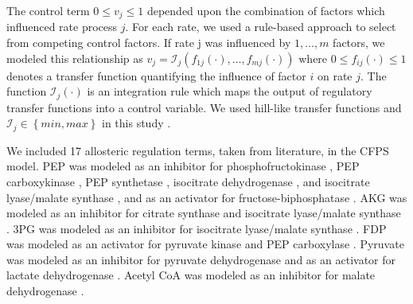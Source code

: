 \documentclass[12pt]{article}
\begin{document}
The control term $0\leq v_{j}\leq 1$ depended upon the combination of factors which influenced rate process $j$.
For each rate, we used a rule-based approach to select from competing control factors.
If rate j was influenced by $1,\dots,m$ factors, we modeled this relationship as
$v_{j}=\mathcal{I}_{j}\left(f_{1j}\left(\cdot\right),\hdots,f_{mj}\left(\cdot\right)\right)$
where $0\leq f_{ij}\left(\cdot\right)\leq 1$ denotes a transfer function quantifying the influence of factor $i$ on rate $j$.
The function $\mathcal{I}_{j}\left(\cdot\right)$ is an integration rule which maps the output of regulatory transfer functions into a control
variable. We used hill-like transfer functions and $\mathcal{I}_{j}\in\left\{min,max\right\}$ in this study \cite{pr3010138}.

We included 17 allosteric regulation terms, taken from literature, in the CFPS model.
PEP was modeled as an inhibitor for phosphofructokinase \cite{2010_kotte_MolSystBiol,2011_cabrera_JBiolChem}, PEP carboxykinase \cite{2010_kotte_MolSystBiol}, PEP synthetase \cite{2010_kotte_MolSystBiol,1973_chulavatnatol_JBiolChem}, isocitrate dehydrogenase \cite{2010_kotte_MolSystBiol,2007_ogawa_JBacteriol}, and isocitrate lyase\slash malate synthase \cite{2010_kotte_MolSystBiol,2007_ogawa_JBacteriol,1988_mackintosh_BiochemJ}, and as an activator for fructose-biphosphatase \cite{2010_kotte_MolSystBiol,2000_donahue_JBacteriol,2006_hines_JBiolChem,2007_hines_JBiolChem}.
AKG was modeled as an inhibitor for citrate synthase \cite{2010_kotte_MolSystBiol,1994_pereira_JBiolChem,1983_robinson_FEBSLett} and isocitrate lyase\slash malate synthase \cite{2010_kotte_MolSystBiol,1988_mackintosh_BiochemJ}.
3PG was modeled as an inhibitor for isocitrate lyase\slash malate synthase \cite{2010_kotte_MolSystBiol,1988_mackintosh_BiochemJ}.
FDP was modeled as an activator for pyruvate kinase \cite{2010_kotte_MolSystBiol,2010_zhu_Biochimie} and PEP carboxylase \cite{2010_kotte_MolSystBiol,1972_wohl_JBiolChem}.
Pyruvate was modeled as an inhibitor for pyruvate dehydrogenase \cite{2010_kotte_MolSystBiol,2007_kale_JBiolChem,2002_arjunan_Biochemistry} and as an activator for lactate dehydrogenase \cite{2008_okino_ApplMicrobiolBiotechnol}.
Acetyl CoA was modeled as an inhibitor for malate dehydrogenase \cite{2010_kotte_MolSystBiol}.
\end{document}
